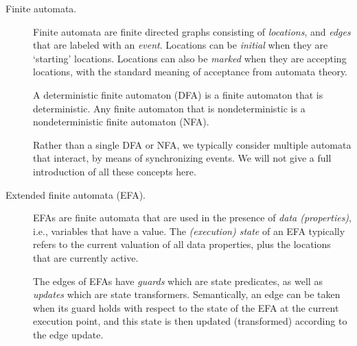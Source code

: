 \documentclass{article}
\theoremstyle{definition}
\begin{document}
\begin{description}
	\item[Finite automata.]
	Finite automata are finite directed graphs consisting of \emph{locations}, and \emph{edges} that are labeled with an \emph{event}.
	Locations can be \emph{initial} when they are `starting' locations.
	Locations can also be \emph{marked} when they are accepting locations, with the standard meaning of acceptance from automata theory.

	A deterministic finite automaton (DFA) is a finite automaton that is deterministic.
	Any finite automaton that is nondeterministic is a nondeterministic finite automaton (NFA).

	Rather than a single DFA or NFA, we typically consider multiple automata that interact, by means of synchronizing events.
	We will not give a full introduction of all these concepts here.

	\item[Extended finite automata (EFA).]
	EFAs are finite automata that are used in the presence of \emph{data (properties)}, i.e., variables that have a value.
	The \emph{(execution) state} of an EFA typically refers to the current valuation of all data properties, plus the locations that are currently active.

	The edges of EFAs have \emph{guards} which are state predicates, as well as \emph{updates} which are state transformers.
	Semantically, an edge can be taken when its guard holds with respect to the state of the EFA at the current execution point, and this state is then updated (transformed) according to the edge update.


\end{description}
\end{document}

